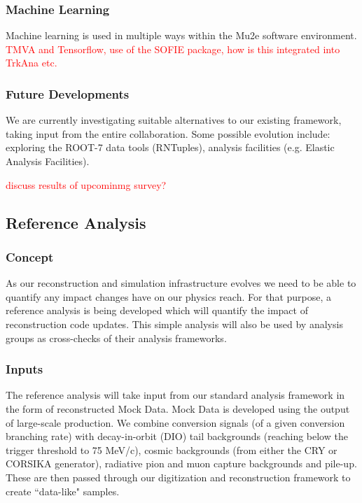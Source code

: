 \subsubsection{Machine Learning}

Machine learning is used in multiple ways within the Mu2e software environment. \textcolor{red}{TMVA and Tensorflow, use of the SOFIE package, how is this integrated into TrkAna etc.}

\subsubsection{Future Developments}

We are currently investigating suitable alternatives to our existing framework, taking input from the entire collaboration. Some possible evolution include: exploring the ROOT-7 data tools (RNTuples), analysis facilities (e.g. Elastic Analysis Facilities).

\textcolor{red}{discuss results of upcominmg survey?}


\subsection{Reference Analysis}

\subsubsection{Concept}
As our reconstruction and simulation infrastructure evolves we need to be able to quantify any impact changes have on our physics reach. For that purpose, a reference analysis is being developed which will quantify the impact of reconstruction code updates. This simple analysis will also be used by analysis groups as cross-checks of their analysis frameworks.

\subsubsection{Inputs}
The reference analysis will take input from our standard analysis framework in the form of reconstructed Mock Data. Mock Data is developed using the output of large-scale production. We combine conversion signals (of a given conversion branching rate) with decay-in-orbit (DIO) tail backgrounds (reaching below the trigger threshold to 75 MeV/c), cosmic backgrounds (from either the CRY or CORSIKA generator), radiative pion and muon capture backgrounds and pile-up. These are then passed through our digitization and reconstruction framework to create ``data-like" samples. 


